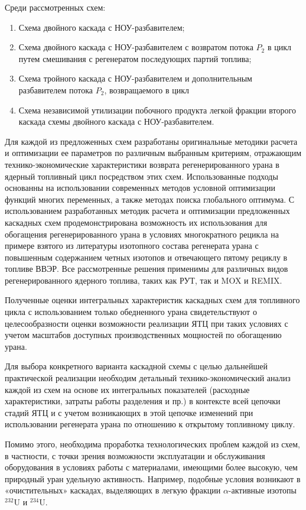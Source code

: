 Среди рассмотренных схем:
\begin{enumerate}
  \item Схема двойного каскада с НОУ-разбавителем;
  \item Схема двойного каскада с НОУ-разбавителем с возвратом потока $P_2$ в цикл путем смешивания с регенератом последующих партий топлива;
  \item Схема тройного каскада с НОУ-разбавителем и дополнительным разбавителем потока $P_2$, возвращаемого в цикл
  \item Схема независимой утилизации побочного продукта легкой фракции второго каскада схемы двойного каскада с НОУ-разбавителем.
\end{enumerate}


Для каждой из предложенных схем разработаны оригинальные методики расчета и оптимизации ее параметров по различным выбранным критериям,  отражающим технико-экономические характеристики возврата регенерированного урана в ядерный топливный цикл посредством этих схем. Использованные подходы основанны на использовании современных методов условной оптимизации функций многих переменных, а также методах поиска глобального оптимума. С использованием разработанных методик расчета и оптимизации предложенных каскадных схем продемонстрирована возможность их использования для обогащения регенерированного урана в условиях многократного рецикла на примере взятого из литературы изотопного состава регенерата урана с повышенным содержанием четных изотопов и отвечающего пятому рециклу в топливе ВВЭР. Все рассмотренные решения применимы для различных видов регенерированного ядерного топлива, таких как РУТ, так и MOX и REMIX.

Полученные оценки интегральных характеристик каскадных схем для топливного цикла с использованием только обедненного урана свидетельствуют о целесообразности оценки возможности реализации ЯТЦ при таких условиях с учетом масштабов доступных производственных мощностей по обогащению урана.

Для выбора конкретного варианта каскадной схемы с целью дальнейшей практической реализации необходим детальный технико-экономический анализ каждой из схем на основе их интегральных показателей (расходные характеристики, затраты работы разделения и пр.) в контексте всей цепочки стадий ЯТЦ и с учетом возникающих в этой цепочке изменений при использовании регенерата урана по отношению к открытому топливному циклу. 

Помимо этого, необходима проработка технологических проблем каждой из схем, в частности, с точки зрения возможности эксплуатации и обслуживания оборудования в условиях работы с материалами, имеющими более высокую, чем природный уран удельную активность. Например, подобные условия возникают в «очистительных» каскадах, выделяющих в легкую фракции $\alpha$-активные изотопы $^{232}$U и $^{234}$U. 


